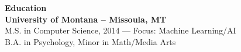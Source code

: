 \documentclass[9pt]{article}
\begin{document}
\begin{multicols}{2}
\begin{itemize}[leftmargin=*]
\end{itemize}

\noindent
\textbf{\large Education}\\
\textbf{University of Montana – Missoula, MT} \\
M.S. in Computer Science, 2014 — Focus: Machine Learning/AI \\
B.A. in Psychology, Minor in Math/Media Arts

\end{multicols}
\end{document}
